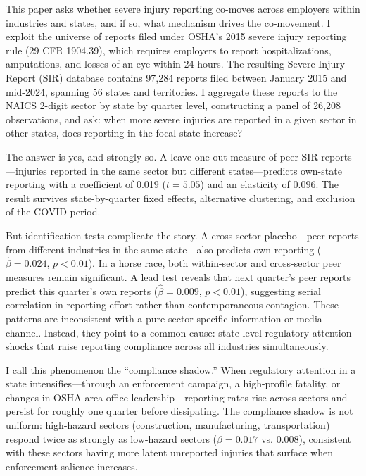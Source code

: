 \documentclass[12pt]{article}
\begin{document}
This paper asks whether severe injury reporting co-moves across employers within industries and states, and if so, what mechanism drives the co-movement. I exploit the universe of reports filed under OSHA's 2015 severe injury reporting rule (29 CFR 1904.39), which requires employers to report hospitalizations, amputations, and losses of an eye within 24 hours. The resulting Severe Injury Report (SIR) database contains 97,284 reports filed between January 2015 and mid-2024, spanning 56 states and territories. I aggregate these reports to the NAICS 2-digit sector by state by quarter level, constructing a panel of 26,208 observations, and ask: when more severe injuries are reported in a given sector in other states, does reporting in the focal state increase?

The answer is yes, and strongly so. A leave-one-out measure of peer SIR reports---injuries reported in the same sector but different states---predicts own-state reporting with a coefficient of 0.019 ($t = 5.05$) and an elasticity of 0.096. The result survives state-by-quarter fixed effects, alternative clustering, and exclusion of the COVID period.

But identification tests complicate the story. A cross-sector placebo---peer reports from different industries in the same state---also predicts own reporting ($\hat{\beta} = 0.024$, $p < 0.01$). In a horse race, both within-sector and cross-sector peer measures remain significant. A lead test reveals that next quarter's peer reports predict this quarter's own reports ($\hat{\beta} = 0.009$, $p < 0.01$), suggesting serial correlation in reporting effort rather than contemporaneous contagion. These patterns are inconsistent with a pure sector-specific information or media channel. Instead, they point to a common cause: state-level regulatory attention shocks that raise reporting compliance across all industries simultaneously.

I call this phenomenon the ``compliance shadow.'' When regulatory attention in a state intensifies---through an enforcement campaign, a high-profile fatality, or changes in OSHA area office leadership---reporting rates rise across sectors and persist for roughly one quarter before dissipating. The compliance shadow is not uniform: high-hazard sectors (construction, manufacturing, transportation) respond twice as strongly as low-hazard sectors ($\hat{\beta} = 0.017$ vs. $0.008$), consistent with these sectors having more latent unreported injuries that surface when enforcement salience increases.
\end{document}
